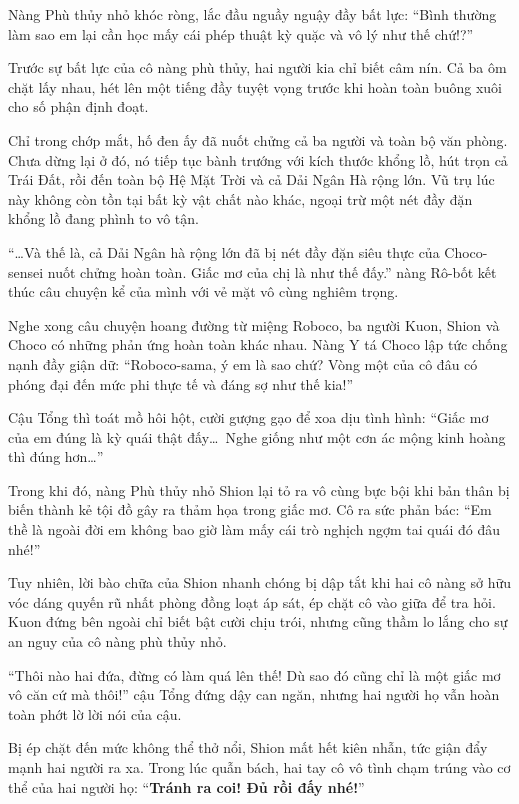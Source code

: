 \documentclass[../main.tex]{subfiles}
\begin{document}
Nàng Phù thủy nhỏ khóc ròng, lắc đầu nguầy nguậy đầy bất lực:
``Bình thường làm sao em lại cần học mấy cái phép thuật kỳ quặc và vô lý như thế chứ!?''

Trước sự bất lực của cô nàng phù thủy, hai người kia chỉ biết câm nín. Cả ba ôm chặt lấy nhau, hét lên một tiếng đầy tuyệt vọng trước khi hoàn toàn buông xuôi cho số phận định đoạt.


Chỉ trong chớp mắt, hố đen ấy đã nuốt chửng cả ba người và toàn bộ văn phòng. Chưa dừng lại ở đó, nó tiếp tục bành trướng với kích thước khổng lồ, hút trọn cả Trái Đất, rồi đến toàn bộ Hệ Mặt Trời và cả Dải Ngân Hà rộng lớn. Vũ trụ lúc này không còn tồn tại bất kỳ vật chất nào khác, ngoại trừ một nét đầy đặn khổng lồ đang phình to vô tận.

\il

``\dots Và thế là, cả Dải Ngân hà rộng lớn đã bị nét đầy đặn siêu thực của Choco-sensei nuốt chửng hoàn toàn. Giấc mơ của chị là như thế đấy.'' nàng Rô-bốt kết thúc câu chuyện kể của mình với vẻ mặt vô cùng nghiêm trọng.

Nghe xong câu chuyện hoang đường từ miệng Roboco, ba người Kuon, Shion và Choco có những phản ứng hoàn toàn khác nhau. Nàng Y tá Choco lập tức chống nạnh đầy giận dữ:
``Roboco-sama, ý em là sao chứ? Vòng một của cô đâu có phóng đại đến mức phi thực tế và đáng sợ như thế kia!''

Cậu Tổng thì toát mồ hôi hột, cười gượng gạo để xoa dịu tình hình:
``Giấc mơ của em đúng là kỳ quái thật đấy\dots\ Nghe giống như một cơn ác mộng kinh hoàng thì đúng hơn\dots''

Trong khi đó, nàng Phù thủy nhỏ Shion lại tỏ ra vô cùng bực bội khi bản thân bị biến thành kẻ tội đồ gây ra thảm họa trong giấc mơ. Cô ra sức phản bác:
``Em thề là ngoài đời em không bao giờ làm mấy cái trò nghịch ngợm tai quái đó đâu nhé!''


Tuy nhiên, lời bào chữa của Shion nhanh chóng bị dập tắt khi hai cô nàng sở hữu vóc dáng quyến rũ nhất phòng đồng loạt áp sát, ép chặt cô vào giữa để tra hỏi. Kuon đứng bên ngoài chỉ biết bật cười chịu trói, nhưng cũng thầm lo lắng cho sự an nguy của cô nàng phù thủy nhỏ.

``Thôi nào hai đứa, đừng có làm quá lên thế! Dù sao đó cũng chỉ là một giấc mơ vô căn cứ mà thôi!'' cậu Tổng đứng dậy can ngăn, nhưng hai người họ vẫn hoàn toàn phớt lờ lời nói của cậu.

Bị ép chặt đến mức không thể thở nổi, Shion mất hết kiên nhẫn, tức giận đẩy mạnh hai người ra xa. Trong lúc quẫn bách, hai tay cô vô tình chạm trúng vào cơ thể của hai người họ:
``\textbf{Tránh ra coi! Đủ rồi đấy nhé!}''
\end{document}
